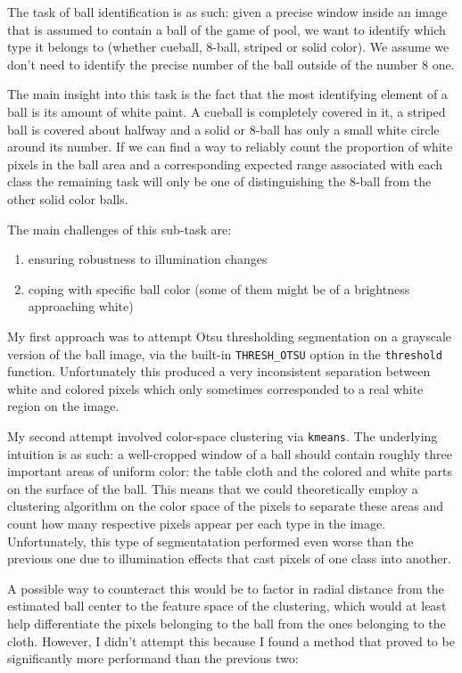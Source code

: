 The task of ball identification is as such: 
given a precise window inside an image that is assumed to 
contain a ball of the game of pool, we want to identify 
which type it belongs to (whether cueball, 8-ball, striped or 
solid color). We assume we don't need to identify the precise 
number of the ball outside of the number 8 one.

The main insight into this task is the fact that the most 
identifying element of a ball is its amount of white paint. 
A cueball is completely covered in it, a striped ball is 
covered about halfway and a solid or 8-ball has only a small 
white circle around its number. If we can find a way to 
reliably count the proportion of white pixels in the ball area 
and a corresponding expected range associated with each class 
the remaining task will only be one of distinguishing the 
8-ball from the other solid color balls.

The main challenges of this sub-task are:
\begin{enumerate}
  \item ensuring robustness to illumination changes
  \item coping with specific ball color 
  (some of them might be of a brightness approaching white)
\end{enumerate}

My first approach was to attempt Otsu thresholding segmentation
on a grayscale version of the ball image, 
via the built-in \verb|THRESH_OTSU| option in the \verb|threshold| function.
Unfortunately this produced a very inconsistent separation between white and 
colored pixels which only sometimes corresponded to a real white region 
on the image.

My second attempt involved color-space clustering via \verb|kmeans|. 
The underlying intuition is as such: a well-cropped window of a ball should 
contain roughly three important areas of uniform color: the table cloth and 
the colored and white parts on the surface of the ball. This means that 
we could theoretically employ a clustering algorithm on the color space 
of the pixels to separate these areas and count how many respective pixels 
appear per each type in the image.  
Unfortunately, this type of segmentatation performed even worse than the 
previous one due to illumination effects that cast pixels of one class 
into another.

A possible way to counteract this would be to factor in radial distance 
from the estimated ball center to the feature space of the clustering, 
which would at least help differentiate the pixels belonging to the 
ball from the ones belonging to the cloth. However, I didn't attempt 
this because I found a method that proved to be significantly more 
performand than the previous two:

